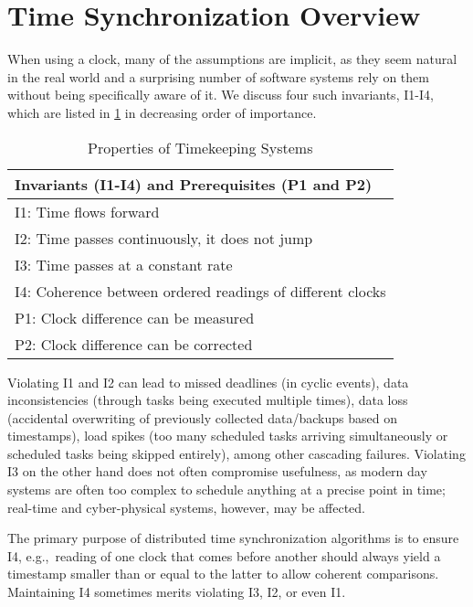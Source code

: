 \section{Time Synchronization Overview}
\label{sec:ptp-overview}
When using a clock, many of the assumptions are implicit,
as they seem natural in the real world and a surprising number of software
systems rely on them without being specifically aware of it.
We discuss four such invariants, I1-I4, which are listed in
\cref{tab:invariants} in decreasing order of importance.
\begin{table}
    \centering
    \caption{Properties of Timekeeping Systems}
    \begin{tabular}{l}
    \toprule
    \textbf{Invariants (I1-I4) and Prerequisites (P1 and P2)} \\
    \midrule
    I1: Time flows forward \\
    I2: Time passes continuously, it does not jump \\
    I3: Time passes at a constant rate \\
    I4: Coherence between ordered readings of different clocks  \\
    P1: Clock difference can be measured  \\
    P2: Clock difference can be corrected  \\
    \bottomrule
    \end{tabular}
    \label{tab:invariants}
\end{table}

Violating I1 and I2 can lead to missed deadlines (in cyclic events),
data inconsistencies (through tasks being executed multiple times),
data loss (accidental overwriting of previously collected data/backups based on timestamps),
load spikes (too many scheduled tasks arriving simultaneously or scheduled tasks being skipped entirely),
among other cascading failures.
Violating I3 on the other hand does not often compromise usefulness,
as modern day systems are often too complex to schedule anything at a precise
point in time; real-time and cyber-physical systems, however, may be affected.

The primary purpose of distributed time synchronization algorithms is to
ensure I4,
e.g.,~reading of one clock that comes before another should
always yield a timestamp smaller than or equal to the latter to allow coherent
comparisons.
Maintaining I4 sometimes merits violating I3, I2, or even I1.

